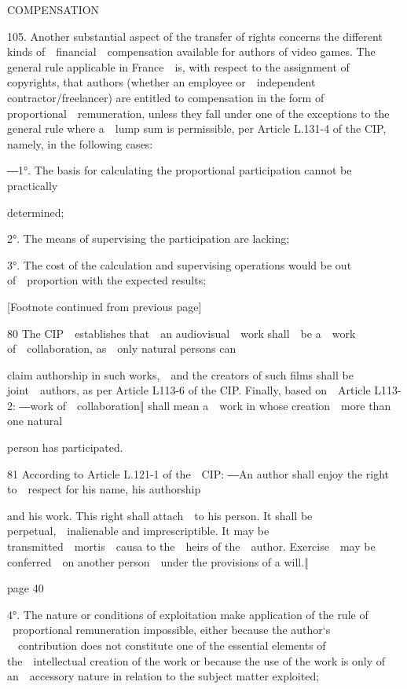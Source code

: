 \documentclass[
]{article}
\begin{document}
{COMPENSATION}

{105. }{Another substantial aspect of the transfer of rights concerns
the different kinds of~~financial~~compensation available for authors of
video games. The general rule applicable in France~~is, with respect to
the assignment of copyrights, that authors (whether an employee
or~~independent contractor/freelancer) are entitled to compensation in
the form of proportional~~remuneration, unless they fall under one of
the exceptions to the general rule where a~~lump sum is permissible, per
Article L.131-4 of the }{CIP}{, namely, in the following cases:}

{―1°}{. The basis for calculating the proportional participation cannot
be practically}

{determined;}

{2°. The means of supervising the participation are lacking;}

{3°. The cost of the calculation and supervising operations would be out
of~~proportion with the expected results;}

{{[}Footnote continued from previous page{]}}

{80 }{The }{CIP~~}{establishes that~~an audiovisual~~work shall~~be
a~~}{work of~~collaboration}{, as~~only natural persons can}

{claim authorship in such works,~~and the creators of such films shall
be }{joint~~authors}{, as per Article L113-6 of the }{CIP}{. Finally,
based on~~Article L113-2: }{―}{w}{ork of~~collaboration‖ shall mean
a~~work in }{whose creation~~more than one natural}

{person has participated.}

{81 }{According to Article L.121-1 of the~~}{CIP}{: ―}{An author shall
enjoy the right to~~respect for his name, his authorship}

{and his work. This right shall attach~~to his person. It shall be
perpetual,~~inalienable and imprescriptible. It may be
transmitted~~}{mortis~~causa }{to the~~heirs of the~~author.
Exercise~~may be conferred~~on another person~~under the provisions of a
will.}{‖}

{page 40}

{4°. The nature or conditions of exploitation make application of the
rule of }{~proportional remuneration impossible, either because the
author`s }{~~contribution does not constitute one of the essential
elements of the~~intellectual creation of the work or because the use of
the work is only of an~~accessory nature in relation to the subject
matter exploited;}
\end{document}
